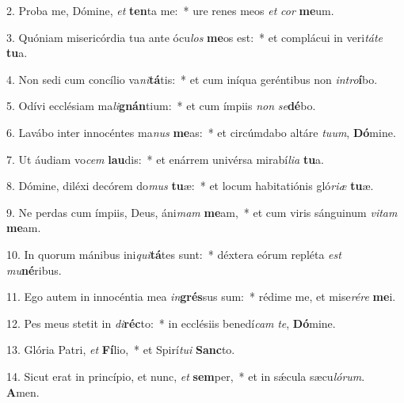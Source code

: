 2. Proba me, Dómine, \textit{et} \textbf{ten}ta me:~*  ure renes meos \textit{et} \textit{cor} \textbf{me}um.\

3. Quóniam misericórdia tua ante ócu\textit{los} \textbf{me}os est:~*  et complácui in veri\textit{tá}\textit{te} \textbf{tu}a.\

4. Non sedi cum concílio va\textit{ni}\textbf{tá}tis:~*  et cum iníqua geréntibus non \textit{in}\textit{tro}\textbf{í}bo.\

5. Odívi ecclésiam ma\textit{li}\textbf{gnán}tium:~*  et cum ímpiis \textit{non} \textit{se}\textbf{dé}bo.\

6. Lavábo inter innocéntes ma\textit{nus} \textbf{me}as:~*  et circúmdabo altáre \textit{tu}\textit{um}, \textbf{Dó}mine.\

7. Ut áudiam vo\textit{cem} \textbf{lau}dis:~*  et enárrem univérsa mirabí\textit{li}\textit{a} \textbf{tu}a.\

8. Dómine, diléxi decórem do\textit{mus} \textbf{tu}æ:~*  et locum habitatiónis gló\textit{ri}\textit{æ} \textbf{tu}æ.\

9. Ne perdas cum ímpiis, Deus, áni\textit{mam} \textbf{me}am,~*  et cum viris sánguinum \textit{vi}\textit{tam} \textbf{me}am.\

10. In quorum mánibus ini\textit{qui}\textbf{tá}tes sunt:~*  déxtera eórum repléta \textit{est} \textit{mu}\textbf{né}ribus.\

11. Ego autem in innocéntia mea \textit{in}\textbf{grés}sus sum:~*  rédime me, et mise\textit{ré}\textit{re} \textbf{me}i.\

12. Pes meus stetit in \textit{di}\textbf{réc}to:~*  in ecclésiis benedí\textit{cam} \textit{te}, \textbf{Dó}mine.\

13. Glória Patri, \textit{et} \textbf{Fí}lio,~*  et Spirí\textit{tu}\textit{i} \textbf{Sanc}to.\

14. Sicut erat in princípio, et nunc, \textit{et} \textbf{sem}per,~*  et in sǽcula sæcu\textit{ló}\textit{rum}. \textbf{A}men.\

